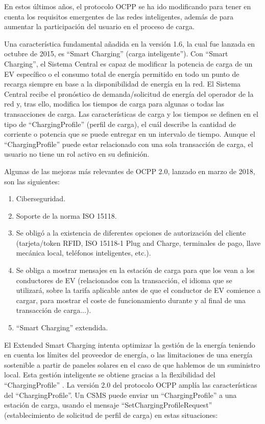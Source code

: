 \documentclass[12pt,a4paper,onecolumn,oneside]{report}
\begin{document}
En estos últimos años, el protocolo OCPP se ha ido modificando para tener en cuenta los requisitos emergentes de las redes inteligentes, además de para aumentar la participación del usuario en el proceso de carga.

Una característica fundamental añadida en la versión 1.6, la cual fue lanzada en octubre de 2015, es ``Smart Charging” (carga inteligente”). Con ``Smart Charging”,  el Sistema Central es capaz de modificar la potencia de carga de un EV específico o el consumo total de energía permitido en todo un punto de recarga siempre en base a la disponibilidad de energía en la red. El Sistema Central recibe el pronóstico de demanda/solicitud de energía del operador de la red y, tras ello, modifica los tiempos de carga para algunas o todas las transacciones de carga. Las características de carga y los tiempos se definen en el tipo de ``ChargingProfile” (perfil de carga), el cuál describe la cantidad de corriente o potencia que se puede entregar en un intervalo de tiempo. Aunque el ``ChargingProfile” puede estar relacionado con una sola transacción de carga, el usuario no tiene un rol activo en su definición.

Algunas de las mejoras más relevantes de OCPP 2.0, lanzado en marzo de 2018, son las siguientes:

\begin{enumerate}

\item Ciberseguridad.
\item Soporte de la norma ISO 15118.
\item Se obligó a la existencia de diferentes opciones de autorización del cliente (tarjeta/token RFID, ISO 15118-1 Plug and Charge, terminales de pago, llave mecánica local, teléfonos inteligentes, etc.).
\item Se obliga a mostrar mensajes en la estación de carga para que los vean a los conductores de EV (relacionados con la transacción, el idioma que se utilizará, sobre la tarifa aplicable antes de que el conductor de EV comience a cargar, para mostrar el coste de funcionamiento durante y al final de una transacción de carga...).
\item ``Smart Charging” extendida.

\end{enumerate}

El Extended Smart Charging intenta optimizar la gestión de la energía teniendo en cuenta los límites del proveedor de energía, o las limitaciones de una energía sostenible a partir de paneles solares en el caso de que hablemos de un suministro local. Esta gestión inteligente se obtiene gracias a la flexibilidad del ``ChargingProfile” . La versión 2.0 del protocolo OCPP amplía las características del ``ChargingProfile”. Un CSMS puede enviar un ``ChargingProfile” a una estación de carga, usando el mensaje ``SetChargingProfileRequest” (establecimiento de solicitud de perfil de carga) en estas situaciones:
\end{document}
